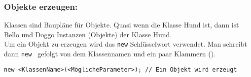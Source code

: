 \begin{Infobox}

	\subsubsection*{Objekte erzeugen:}
	Klassen sind Baupläne für Objekte. Quasi wenn die Klasse Hund ist, dann ist Bello und Doggo Instanzen (Objekte) der Klasse Hund.\\
	Um ein Objekt zu erzeugen wird das \lstinline{new} Schlüsselwort verwendet.
	Man schreibt dann \lstinline{new } gefolgt von dem Klassennamen und ein paar Klammern ().
\end{Infobox}
\begin{lstlisting}[title=\textbf{Objekt erstellen Syntax}]
	new <KlassenName>(<MöglicheParameter>); // Ein Objekt wird erzeugt
\end{lstlisting}

